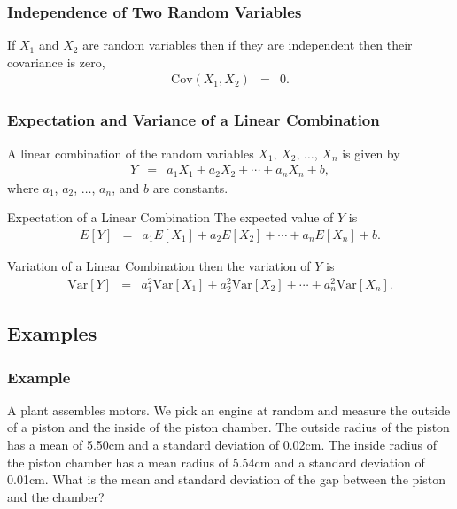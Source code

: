 \begin{frame}
  \frametitle{Independence of Two Random Variables}

    If $X_1$ and $X_2$ are random variables then if they are independent
    then their covariance is zero,
    \begin{eqnarray*}
      \mathrm{Cov}(X_1,X_2) & = & 0.
    \end{eqnarray*}
  
\end{frame}

\begin{frame}
  \frametitle{Expectation and Variance of a Linear Combination}

  A linear combination of the random variables $X_1$, $X_2$, $\ldots$,
  $X_n$ is given by
  \begin{eqnarray*}
    Y & = & a_1 X_1 + a_2 X_2 + \cdots + a_n X_n + b,
  \end{eqnarray*}
  where $a_1$, $a_2$, $\ldots$, $a_n$, and $b$ are constants.


  \begin{block}{Expectation of a Linear Combination}
    The expected value of $Y$ is 
    \begin{eqnarray*}
      E[Y] & = & a_1 E[X_1] + a_2 E[X_2] + \cdots + a_n E[X_n] + b.
    \end{eqnarray*}
  \end{block}

  \begin{block}{Variation of a Linear Combination}
     then the
    variation of $Y$ is
    \begin{eqnarray*}
      \mathrm{Var}[Y] & = & a_1^2 \mathrm{Var}[X_1] + a_2^2 \mathrm{Var}[X_2] + \cdots + a_n^2 \mathrm{Var}[X_n].
    \end{eqnarray*}

  \end{block}

  
\end{frame}


\subsection{Examples}

\begin{frame}
  \frametitle{Example}
  A plant assembles motors. We pick an engine at random and measure
  the outside of a piston and the inside of the piston chamber. The
  outside radius of the piston has a mean of 5.50cm and a standard
  deviation of 0.02cm. The inside radius of the piston chamber has a
  mean radius of 5.54cm and a standard deviation of 0.01cm. What is
  the mean and standard deviation of the gap between the piston and
  the chamber?
\end{frame}

